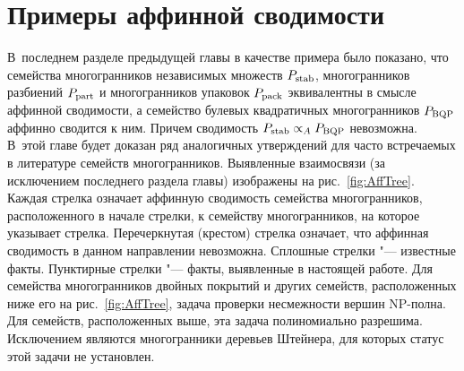 
%
%
\chapter{Примеры аффинной сводимости}
\label{chap:AffExamples}


В~последнем разделе предыдущей главы в качестве примера было показано, что семейства многогранников независимых множеств $P_{\textup{stab}}$, многогранников разбиений $P_{\textup{part}}$ и многогранников упаковок $P_{\textup{pack}}$ эквивалентны в смысле аффинной сводимости, а семейство булевых квадратичных многогранников $P_{\textup{BQP}}$ аффинно сводится к ним. Причем сводимость $P_{\textup{stab}} \propto_A P_{\textup{BQP}}$ невозможна.
В~этой главе будет доказан ряд аналогичных утверждений для часто встречаемых в литературе семейств многогранников. Выявленные взаимосвязи (за исключением последнего раздела главы) изображены на рис.~\ref{fig:AffTree}. Каждая стрелка означает аффинную сводимость семейства многогранников, расположенного в начале стрелки, к семейству многогранников, на которое указывает стрелка. Перечеркнутая (крестом) стрелка означает, что аффинная сводимость в данном направлении невозможна. Сплошные стрелки "--- известные 
факты. Пунктирные стрелки "--- факты, выявленные в настоящей работе. Для семейства многогранников двойных покрытий и других семейств, расположенных ниже его на рис.~\ref{fig:AffTree}, задача проверки несмежности вершин NP-полна. Для семейств, расположенных выше, эта задача полиномиально разрешима. Исключением являются многогранники деревьев Штейнера, для которых статус этой задачи не установлен.

